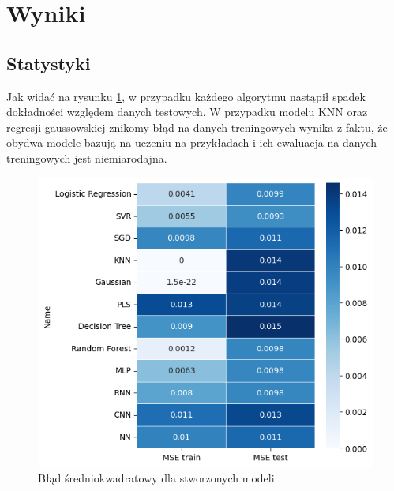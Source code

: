 

\section{Wyniki}

\subsection{Statystyki}

Jak widać na rysunku \ref{mse}, w przypadku każdego algorytmu nastąpił
spadek dokładności względem danych testowych. W przypadku modelu KNN oraz
regresji gaussowskiej znikomy błąd na danych treningowych wynika z faktu, 
że obydwa modele bazują na uczeniu na przykładach i ich ewaluacja na 
danych treningowych jest niemiarodajna. 

\begin{figure}[H]
    \centering
    \includegraphics[width=\textwidth]{images/mse.png}
    \caption{Błąd średniokwadratowy dla stworzonych modeli}
    \label{mse}
\end{figure}

